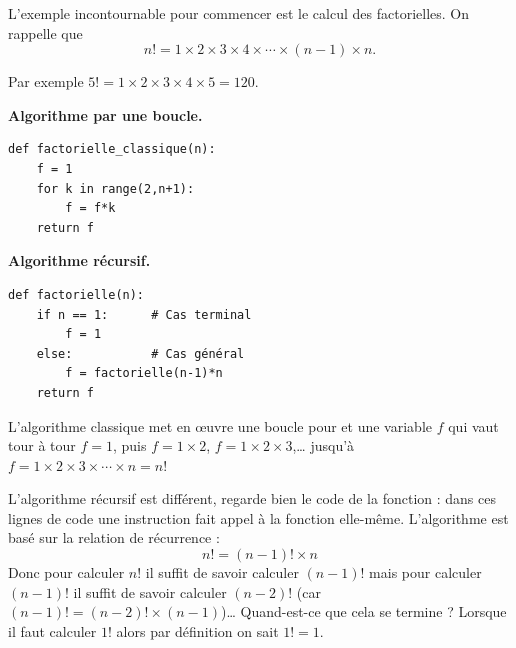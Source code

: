 \documentclass[11pt,class=report,crop=false]{standalone}
\begin{document}
\begin{cours}

L'exemple incontournable pour commencer est le calcul des factorielles. On rappelle que 
$$n ! = 1\times 2 \times 3 \times 4 \times \cdots \times (n-1) \times n.$$

Par exemple $5! = 1\times 2 \times 3 \times 4 \times 5 = 120$.


\begin{center}
\begin{minipage}{0.45\textwidth}
\textbf{Algorithme par une boucle.}
\begin{lstlisting}
def factorielle_classique(n):
    f = 1
    for k in range(2,n+1):
        f = f*k
    return f
\end{lstlisting}
\end{minipage}
\begin{minipage}{0.45\textwidth}
\textbf{Algorithme récursif.}
\begin{lstlisting}
def factorielle(n):
    if n == 1:      # Cas terminal
        f = 1
    else:           # Cas général
        f = factorielle(n-1)*n
    return f
\end{lstlisting}
\end{minipage}
\end{center}

L'algorithme classique met en \oe uvre une boucle \og{}pour\fg{} et une variable $f$ qui vaut tour à tour $f=1$, puis $f=1 \times 2$, $f =1 \times 2 \times 3$,\ldots{} jusqu'à $f = 1\times 2 \times 3 \times \cdots \times n = n!$

L'algorithme récursif est différent, regarde bien le code de la fonction  : dans ces lignes de code une instruction fait appel à la fonction  elle-même. L'algorithme est basé sur la relation de récurrence :
$$n! = (n-1)! \times n$$
Donc pour calculer $n!$ il suffit de savoir calculer $(n-1)!$ mais pour calculer $(n-1)!$ il suffit de savoir calculer $(n-2)!$ (car $(n-1)! = (n-2)! \times (n-1)$)\ldots{} Quand-est-ce que cela se termine ?  Lorsque il faut calculer $1!$ alors par définition on sait $1!=1$.



\end{cours}
\end{document}
